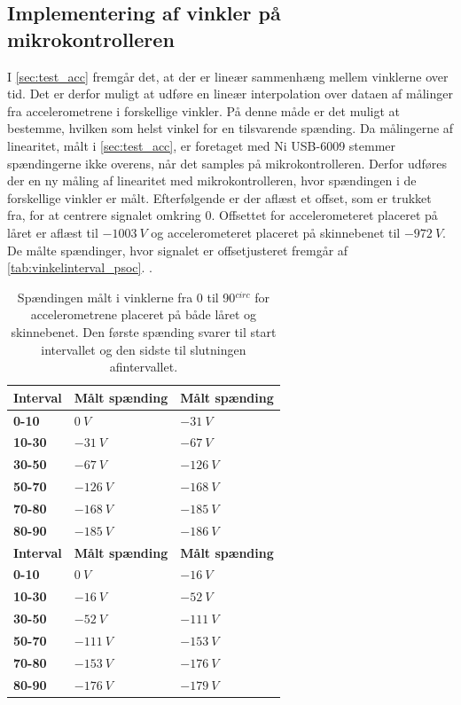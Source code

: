 \subsection{Implementering af vinkler på mikrokontrolleren}
I \autoref{sec:test_acc} fremgår det, at der er lineær sammenhæng mellem vinklerne over tid. Det er derfor muligt at udføre en lineær interpolation over dataen af målinger fra accelerometrene i forskellige vinkler. På denne måde er det muligt at bestemme, hvilken som helst vinkel for en tilsvarende spænding. Da målingerne af linearitet, målt i \autoref{sec:test_acc}, er foretaget med Ni USB-6009 stemmer spændingerne ikke overens, når det samples på mikrokontrolleren. Derfor udføres der en ny måling af linearitet med mikrokontrolleren, hvor spændingen i de forskellige vinkler er målt. Efterfølgende er der aflæst et offset, som er trukket fra, for at centrere signalet omkring 0. Offsettet for accelerometeret placeret på låret er aflæst til $-1003~V$ og accelerometeret placeret på skinnebenet til $-972~V$. De målte spændinger, hvor signalet er offsetjusteret fremgår af \autoref{tab:vinkelinterval_psoc}. .

\begin{table}[H]
	\centering
	\begin{tabular}{|l|l|l|}
	\textbf{Interval} & \textbf{Målt spænding} & \textbf{Målt spænding} 	\\ \hline	
    \textbf{0-10} 			& $0~V$							& $-31~V$    \\ \hline
    \textbf{10-30} 			& $-31~V$						& $-67~V$	\\ \hline
    \textbf{30-50} 			& $-67~V$						& $-126~V$	\\ \hline
    \textbf{50-70} 			& $-126~V$						& $-168~V$	\\ \hline
    \textbf{70-80} 			& $-168~V$						& $-185~V$	\\ \hline
    \textbf{80-90} 			& $-185~V$						& $-186~V$	\\ \hline
    	\textbf{Interval} & \textbf{Målt spænding} & \textbf{Målt spænding} 		\\ \hline	
    \textbf{0-10}			& $0~V$ 							& $-16~V$	    \\ \hline
    \textbf{10-30}			& $-16~V$						& $-52~V$	 	\\ \hline
    \textbf{30-50}			& $-52~V$						& $-111~V$		\\ \hline
    \textbf{50-70}			& $-111~V$						& $-153~V$		\\ \hline
    \textbf{70-80}			& $-153~V$						& $-176~V$	 	\\ \hline
     \textbf{80-90}			& $-176~V$						& $-179~V$	 	\\ \hline
	\end{tabular}
	\caption{Spændingen målt i vinklerne fra 0 til 90$^{circ}$ for accelerometrene placeret på både låret og skinnebenet. Den første spænding svarer til start intervallet og den sidste til slutningen afintervallet.}
	\label{tab:vinkelinterval_psoc}
\end{table}

